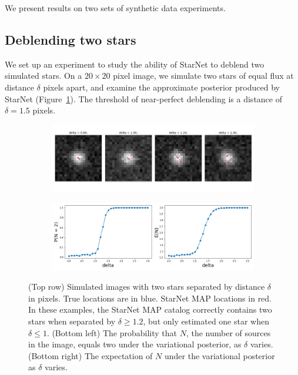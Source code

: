 
We present results on two sets of synthetic data experiments.

\subsection{Deblending two stars}

We set up an experiment to study the
ability of StarNet to deblend two simulated stars.
On a $20\times20$ pixel image,
we simulate two stars of equal flux at distance $\delta$ pixels apart, and
examine the approximate posterior produced by StarNet (Figure~\ref{fig:deblending_fig}).
The threshold of near-perfect deblending is a distance of $\delta = 1.5$ pixels. 

\begin{figure}[tb]
    \centering
    \begin{subfigure}{0.8\textwidth}
        \includegraphics[width=\textwidth]{figures/deblending/example_deblending.png}
    \end{subfigure}
    \begin{subfigure}{0.8\textwidth}
        \includegraphics[width=\textwidth]{figures/deblending/summary_statistics.png}
    \end{subfigure}
    \caption{(Top row) Simulated images with two stars separated by distance $\delta$ in pixels.
    True locations are in blue. StarNet MAP locations in red. 
    In these examples, the StarNet MAP catalog correctly contains two stars when separated by $\delta \geq 1.2$,
    but only estimated one star when $\delta \leq 1$.
    (Bottom left) The probability that $N$, the number of sources in the image, equals two
    under the variational posterior, as $\delta$ varies.
    (Bottom right) The expectation of $N$ under the variational posterior as $\delta$ varies. }
    \label{fig:deblending_fig}
\end{figure}


